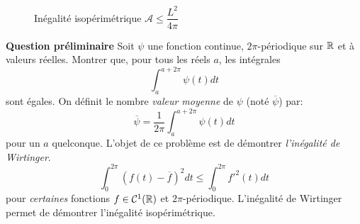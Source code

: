 \begin{figure}[ht]
 \centering
 
 \caption{Inégalité isopérimétrique $\mathcal A \leq \dfrac{L^2}{4\pi}$}
 \label{fig:Ewirti_2}
\end{figure}
\textbf{Question préliminaire}\newline
Soit $\psi$ une fonction continue, $2\pi$-périodique sur $\mathbb{R}$ et à valeurs réelles.\newline
Montrer que, pour tous les réels $a$, les intégrales
\begin{displaymath}
 \int_a^{a+2\pi}\psi(t)dt
\end{displaymath}
sont égales.\newline
On définit le nombre \emph{valeur moyenne} de $\psi$ (noté $\overline{\psi}$) par:
\begin{displaymath}
 \overline{\psi}=\dfrac{1}{2\pi}\int_a^{a+2\pi}\psi(t)dt
\end{displaymath}
pour un $a$ quelconque.\newline
L'objet de ce problème est de démontrer \emph{l'inégalité de Wirtinger}.
\begin{displaymath}
 \int_{0}^{2\pi}(f(t)-\overline{f})^2dt \leq \int_{0}^{2\pi}f'^2(t)dt
\end{displaymath}
pour \emph{certaines} fonctions $f\in\mathcal C^1(\mathbb{R})$ et $2\pi$-périodique.\newline
L'inégalité de Wirtinger permet de démontrer l'inégalité isopérimétrique.
